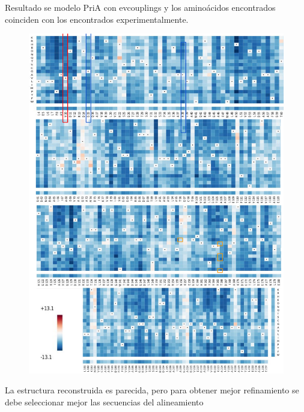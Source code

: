 \documentclass[12pt,twoside]{reedthesis}
\begin{document}
  Resultado se modelo PriA con evcouplings y los aminoácidos encontrados
  coinciden con los encontrados experimentalmente.
  
  \begin{figure}[h!tbp]
  \centering
  \includegraphics[angle = 0,scale = 1]{chapter4/Couplings/PriAMutations.pdf}
  \caption[Tendencia de mutaciones observada en secuencias de PriA]{\footnotesize{}}
  \label{fig:CouplingsMutationsPriA}
  \end{figure}
  
  La estructura reconstruida es parecida, pero para obtener mejor
  refinamiento se debe seleccionar mejor las secuencias del alineamiento
  
\end{document}
